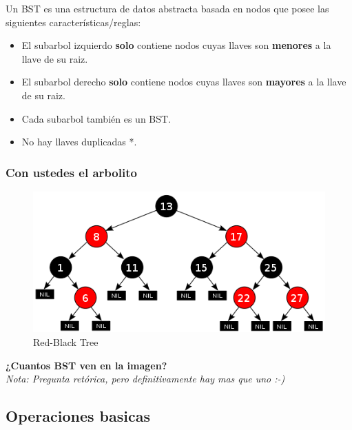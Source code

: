 \documentclass{beamer}
\begin{document}
		\begin{frame}
			Un BST es una estructura de datos abstracta basada en nodos que posee las siguientes características/reglas:
			\begin{itemize}[<+->]
				\item El subarbol izquierdo \textbf{solo} contiene nodos cuyas llaves son \textbf{menores} a la llave de su raiz.
				\item El subarbol derecho \textbf{solo} contiene nodos cuyas llaves son \textbf{mayores} a la llave de su raiz.
				\item Cada subarbol también es un BST.
				\item No hay llaves duplicadas *.
			\end{itemize}
		\end{frame}

		\begin{frame}
			\frametitle{Con ustedes el arbolito}
			\begin{figure}
  				\centering
    			\includegraphics[scale=0.5]{rbtree.png}
  				\caption{Red-Black Tree}
  				\label{fig:ejemplo}
			\end{figure}
			
			\begin{center}
				\textbf{¿Cuantos BST ven en la imagen?}\\
				\textit{Nota: Pregunta retórica, pero definitivamente hay mas que uno :-)}
			\end{center}
		\end{frame}

	\subsection{Operaciones basicas}

\end{document}

